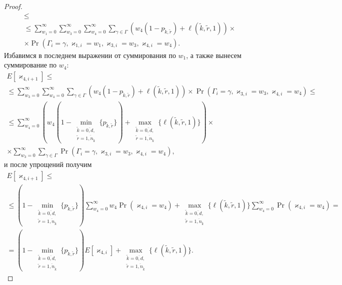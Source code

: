 \begin{proof}
\begin{multline*}
    \leqslant \\ 
    \leqslant
    \sum_{w_1=0}^{\infty} \sum_{w_3=0}^{\infty}  \sum_{w_4=0}^{\infty} \sum_{\gamma \in \Gamma} 
    ( w_4 (1-p_{\tilde{k}, \tilde{r}}) + \ell(\tilde{k}, \tilde{r}, 1) )     \times \\
    \times
    \Pr(\Gamma_{i}=\gamma,  \varkappa_{1, i}=w_1,  \varkappa_{3, i}=w_3,  \varkappa_{4, i}=w_4).
\end{multline*}
Избавимся в последнем выражении от суммирования по $w_1$,  а также вынесем суммирование по $w_4$:
    \begin{multline*}
    E[\varkappa_{4, i+1}]\leqslant\\
    \leqslant
    \sum_{w_3=0}^{\infty}  \sum_{w_4=0}^{\infty} \sum_{\gamma \in \Gamma} 
    ( w_4 (1-p_{\tilde{k}, \tilde{r}}) + \ell(\tilde{k}, \tilde{r}, 1) ) \times 
    \Pr(\Gamma_{i}=\gamma,  \varkappa_{3, i}=w_3,  \varkappa_{4, i}=w_4)  \leqslant\\
    \leqslant
    \sum_{w_4=0}^{\infty}  ( w_4 (1-\min_{\substack{\tilde{k}=\overline{0, d}, \\ \tilde{r}=\overline{1, n_{\tilde{k}}}}}{\{p_{\tilde{k}, \tilde{r}}\}}) + \max_{\substack{\tilde{k}=\overline{0, d}, \\ \tilde{r}=\overline{1, n_{\tilde{k}}}} } {\{\ell(\tilde{k}, \tilde{r}, 1)\}} )    \times \\
   \times \sum_{w_3=0}^{\infty}   \sum_{\gamma \in \Gamma} 
 \Pr(\Gamma_{i}=\gamma,  \varkappa_{3, i}=w_3,  \varkappa_{4, i}=w_4),
\end{multline*}
и после упрощений получим
\begin{multline*}
        E[\varkappa_{4, i+1}]\leqslant\\
    \leqslant
         (1-\min_{\substack{\tilde{k}=\overline{0, d}, \\ \tilde{r}=\overline{1, n_{\tilde{k}}}}}{\{p_{\tilde{k}, \tilde{r}}\}}) \sum_{w_4=0}^{\infty}   w_4 \Pr(\varkappa_{4, i}=w_4) + \max_{\substack{\tilde{k}=\overline{0, d}, \\ \tilde{r}=\overline{1, n_{\tilde{k}}}}}{\{\ell(\tilde{k}, \tilde{r}, 1)\}}    \sum_{w_4=0}^{\infty}\Pr(\varkappa_{4, i}=w_4) = \\
     =
      (1-\min_{\substack{\tilde{k}=\overline{0, d}, \\ \tilde{r}=\overline{1, n_{\tilde{k}}}}}{\{p_{\tilde{k}, \tilde{r}}\}})  E[\varkappa_{4, i}] + \max_{\substack{\tilde{k}=\overline{0, d}, \\ \tilde{r}=\overline{1, n_{\tilde{k}}}}}{\{\ell(\tilde{k}, \tilde{r}, 1)\}} .

\end{multline*}
\end{proof}
